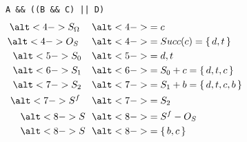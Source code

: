 \documentclass[xcolor = {dvipsnames, table}]{beamer}
\newcommand{\disponslide}[2]{%
    \alt<#1>{#2}{\phantom{#2}}
}
\begin{document}
\begin{frame}[fragile]
    \begin{columns}
        \begin{column}{0.6\textwidth}
            \centering
            \lstinline{A && ((B && C) || D)}
            \begin{align*}
                \disponslide{4-}{S_\Omega} & \disponslide{4-}{= c} \\
                \disponslide{4-}{O_S} & \disponslide{4-}{= Succ(c) = \set{d, t}}  \\
                \disponslide{5-}{S_0} & \disponslide{5-}{= d, t} \\
                \disponslide{6-}{S_1} & \disponslide{6-}{= S_0 + c = \set{d, t, c}} \\
                \disponslide{7-}{S_2} & \disponslide{7-}{= S_1 + b = \set{d, t, c, b}} \\
                \disponslide{7-}{S^f} & \disponslide{7-}{= S_2} \\
                \disponslide{8-}{S}   & \disponslide{8-}{= S^f - O_S} \\
                \disponslide{8-}{S}   & \disponslide{8-}{=\set{b, c}} \\
            \end{align*}
        \end{column}

        \begin{column}{0.4\textwidth}
        \end{column}
    \end{columns}
\end{frame}
\end{document}
